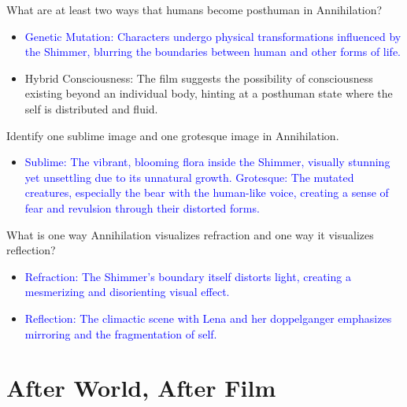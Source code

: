 \documentclass[11pt,fleqn]{book}
\begin{document}
\begin{exercise}
What are at least two ways that humans become posthuman in Annihilation?
\begin{itemize}
\item \textcolor{blue}{Genetic Mutation: Characters undergo physical transformations influenced by the Shimmer, blurring the boundaries between human and other forms of life.}
\item Hybrid Consciousness: The film suggests the possibility of consciousness existing beyond an individual body, hinting at a posthuman state where the self is distributed and fluid. 
\end{itemize}
\end{exercise}

\begin{exercise}
Identify one sublime image and one grotesque image in Annihilation.
\begin{itemize}
\item \textcolor{blue}{Sublime: The vibrant, blooming flora inside the Shimmer, visually stunning yet unsettling due to its unnatural growth.}
\textcolor{blue}{Grotesque: The mutated creatures, especially the bear with the human-like voice, creating a sense of fear and revulsion through their distorted forms.}
\end{itemize}
\end{exercise}

\begin{exercise}
What is one way Annihilation visualizes refraction and one way it visualizes reflection?
\begin{itemize}
\item \textcolor{blue}{Refraction: The Shimmer's boundary itself distorts light, creating a mesmerizing and disorienting visual effect.}
\item \textcolor{blue}{Reflection:  The climactic scene with Lena and her doppelganger emphasizes mirroring and the fragmentation of self.}
\end{itemize}
\end{exercise}




\section{After World, After Film}
\end{document}
